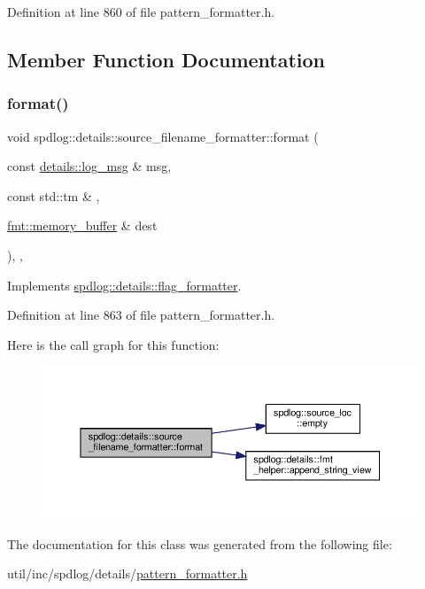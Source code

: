 Definition at line 860 of file pattern\+\_\+formatter.\+h.



\subsection{Member Function Documentation}
\mbox{\label{classspdlog_1_1details_1_1source__filename__formatter_a9a2e549eda5c8044c76281be33b04b38}} 
\subsubsection{\texorpdfstring{format()}{format()}}
{\footnotesize\ttfamily void spdlog\+::details\+::source\+\_\+filename\+\_\+formatter\+::format (\begin{DoxyParamCaption}\item[{const \hyperlink{structspdlog_1_1details_1_1log__msg}{details\+::log\+\_\+msg} \&}]{msg,  }\item[{const std\+::tm \&}]{,  }\item[{\hyperlink{format_8h_a21cbf729f69302f578e6db21c5e9e0d2}{fmt\+::memory\+\_\+buffer} \&}]{dest }\end{DoxyParamCaption})\hspace{0.3cm}{\ttfamily [inline]}, {\ttfamily [override]}, {\ttfamily [virtual]}}



Implements \hyperlink{classspdlog_1_1details_1_1flag__formatter_a33fb3e42a4c8200cceb833d92b53fb67}{spdlog\+::details\+::flag\+\_\+formatter}.



Definition at line 863 of file pattern\+\_\+formatter.\+h.

Here is the call graph for this function\+:
\nopagebreak
\begin{figure}[H]
\begin{center}
\leavevmode
\includegraphics[width=350pt]{classspdlog_1_1details_1_1source__filename__formatter_a9a2e549eda5c8044c76281be33b04b38_cgraph}
\end{center}
\end{figure}


The documentation for this class was generated from the following file\+:\begin{DoxyCompactItemize}
\item 
util/inc/spdlog/details/\hyperlink{pattern__formatter_8h}{pattern\+\_\+formatter.\+h}\end{DoxyCompactItemize}
